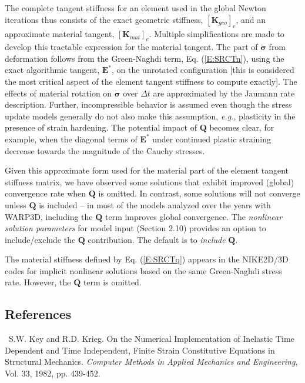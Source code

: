 \documentclass[11pt]{report}
\numberwithin{equation}{section}
\newcommand{\bmf } {\boldsymbol }  %
\newcommand{\eg}{\emph{e.g.},\xspace}
\newcommand{\ti}{\emph}
\newcounter{sectrefs}
\begin{document}
The complete tangent stiffness for an element used in the global
Newton iterations thus consists of the exact
geometric stiffness, $\left [ \mathbf{K}_{geo}\right]_e$,
and an approximate material tangent, $\left [ \mathbf{K}_{mat}\right]_e$.
Multiple simplifications are made to develop
this tractable expression for the material tangent. 
The part of $\dot{\bmf{\sigma}}$ from deformation follows from the 
Green-Naghdi term, Eq. (\ref{E:SRCTn}), using the exact
algorithmic tangent, $\mathbf{E}^*$, on the unrotated configuration [this is 
considered the most critical aspect of the element tangent stiffness to compute exactly]. The
effects of material rotation on $\dot{\bmf{\sigma}}$ over $\Delta t$ are approximated by the
Jaumann rate description. Further,  incompressible behavior is assumed even though
the stress update models generally do not also make this assumption, \eg plasticity
in the presence of strain hardening. 
The potential impact of  $\mathbf{Q}$ becomes clear, for example, when the diagonal
terms of $\mathbf{E}^*$
under continued plastic straining decrease towards the magnitude of the Cauchy stresses. 

Given this approximate form used for the material part of the element tangent stiffness matrix, we have
observed some solutions that exhibit improved (global) convergence rate when $\mathbf{Q}$ is omitted. In contrast,
some solutions will not converge unless $\mathbf{Q}$ is included -- in most of the models analyzed over the
years with WARP3D, including the  $\mathbf{Q}$ term improves global convergence. 
The \ti{nonlinear solution
parameters} for model input (Section 2.10) provides an option to include/exclude the $\mathbf{Q}$  contribution.
The default is to \ti{include} $\mathbf{Q}$.

The material stiffness defined by Eq. (\ref{E:SRCTq}) appears in the NIKE2D/3D codes
for implicit nonlinear solutions based on the same Green-Naghdi stress  rate. However,
the  $\mathbf{Q}$ term is omitted.


%
\subsection {References}
\small 

~S.W. Key and R.D. Krieg.
On the Numerical Implementation of Inelastic Time Dependent and Time Independent, 
Finite Strain Constitutive Equations in Structural Mechanics. \ti{Computer Methods in Applied Mechanics and
Engineering}, Vol. 33, 1982, pp. 439-452.
\end{document}
